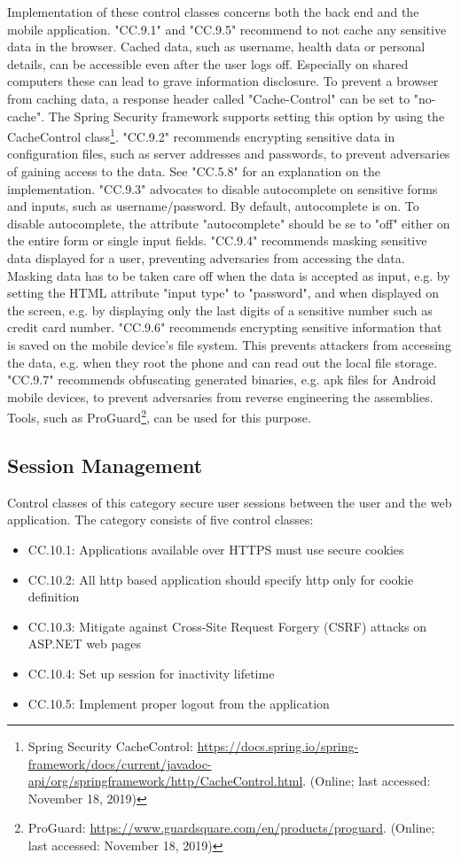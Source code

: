 Implementation of these control classes concerns both the back end and the mobile application. "CC.9.1" and "CC.9.5" recommend to not cache any sensitive data in the browser. Cached data, such as username, health data or personal details, can be accessible even after the user logs off. Especially on shared computers these can lead to grave information disclosure. To prevent a browser from caching data, a response header called "Cache-Control" can be set to "no-cache". The Spring Security framework supports setting this option by using the CacheControl class\footnote{Spring Security CacheControl: \url{https://docs.spring.io/spring-framework/docs/current/javadoc-api/org/springframework/http/CacheControl.html}. (Online; last accessed:  November 18, 2019)}. "CC.9.2" recommends encrypting sensitive data in configuration files, such as server addresses and passwords, to prevent adversaries of gaining access to the data. See "CC.5.8" for an explanation on the implementation. "CC.9.3" advocates to disable autocomplete on sensitive forms and inputs, such as username/password. By default, autocomplete is on. To disable autocomplete, the attribute "autocomplete" should be se to "off" either on the entire form or single input fields. "CC.9.4" recommends masking sensitive data displayed for a user, preventing adversaries from accessing the data. Masking data has to be taken care off when the data is accepted as input, e.g. by setting the HTML attribute "input type" to "password", and when displayed on the screen, e.g. by displaying only the last digits of a sensitive number such as credit card number. "CC.9.6" recommends encrypting sensitive information that is saved on the mobile device's file system. This prevents attackers from accessing the data, e.g. when they root the phone and can read out the local file storage. "CC.9.7" recommends obfuscating generated binaries, e.g. apk files for Android mobile devices, to prevent adversaries from reverse engineering the assemblies. Tools, such as ProGuard\footnote{ProGuard: \url{https://www.guardsquare.com/en/products/proguard}. (Online; last accessed:  November 18, 2019)}, can be used for this purpose.

\subsection{Session Management}
Control classes of this category secure user sessions between the user and the web application. The category consists of five control classes:
\begin{itemize}
    \item CC.10.1: Applications available over HTTPS must use secure cookies
    \item CC.10.2: All http based application should specify http only for cookie definition
    \item CC.10.3: Mitigate against Cross-Site Request Forgery (CSRF) attacks on ASP.NET web pages
    \item CC.10.4: Set up session for inactivity lifetime
    \item CC.10.5: Implement proper logout from the application
\end{itemize}

